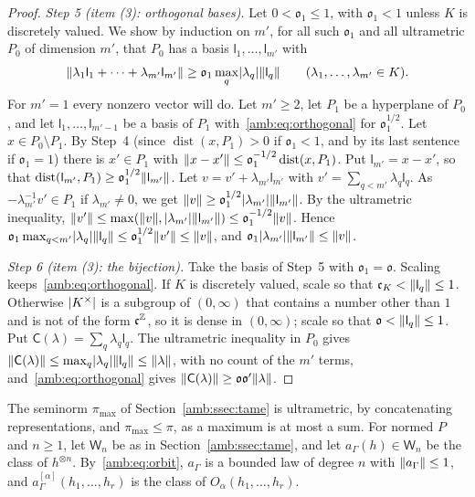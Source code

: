 \begin{proof}
\emph{Step 5 (item (3): orthogonal bases).} Let $0<\mathfrak o_1\le1$, with $\mathfrak o_1<1$ unless $K$ is discretely
valued. We show by induction on $m'$, for all such $\mathfrak o_1$ and all ultrametric $P_0$ of dimension $m'$, that $P_0$ has
a basis $\mathsf l_1,\dots,\mathsf l_{m'}$ with
\begin{equation}\label{amb:eq:orthogonal}
 \lVert \lambda_1\mathsf l_1+\dots+\lambda_{m'}\mathsf l_{m'}\rVert\ge\mathfrak o_1\max_q\lvert \lambda_q\rvert\lVert \mathsf l_q\rVert
 \qquad(\lambda_1,\dots,\lambda_{m'}\in K).
\end{equation}
For $m'=1$ every nonzero vector will do. Let $m'\ge2$, let $P_1$ be a hyperplane of $P_0$, and let
$\mathsf l_1,\dots,\mathsf l_{m'-1}$ be a basis of $P_1$ with~\eqref{amb:eq:orthogonal} for $\mathfrak o_1^{1/2}$. Let
$x\in P_0\setminus P_1$. By Step~4 (since $\operatorname{dist}(x,P_1)>0$ if $\mathfrak o_1<1$, and by its last sentence if $\mathfrak o_1=1$) there is $x'\in P_1$ with $\lVert x-x'\rVert\le\mathfrak o_1^{-1/2}\operatorname{dist}(x,P_1)$.
Put $\mathsf l_{m'}=x-x'$, so that $\operatorname{dist}(\mathsf l_{m'},P_1)\ge\mathfrak o_1^{1/2}\lVert \mathsf l_{m'}\rVert$. Let
$v=v'+\lambda_{m'}\mathsf l_{m'}$ with $v'=\sum_{q<m'}\lambda_q\mathsf l_q$. As $-\lambda_{m'}^{-1}v'\in P_1$ if
$\lambda_{m'}\ne0$, we get $\lVert v\rVert\ge\mathfrak o_1^{1/2}\lvert \lambda_{m'}\rvert\lVert \mathsf l_{m'}\rVert$. By the ultrametric
inequality, $\lVert v'\rVert\le\max(\lVert v\rVert,\lvert \lambda_{m'}\rvert\lVert \mathsf l_{m'}\rVert)\le\mathfrak o_1^{-1/2}\lVert v\rVert$. Hence
$\mathfrak o_1\max_{q<m'}\lvert \lambda_q\rvert\lVert \mathsf l_q\rVert\le\mathfrak o_1^{1/2}\lVert v'\rVert\le\lVert v\rVert$, and
$\mathfrak o_1\lvert \lambda_{m'}\rvert\lVert \mathsf l_{m'}\rVert\le\lVert v\rVert$.

\emph{Step 6 (item (3): the bijection).} Take the basis of Step~5 with $\mathfrak o_1=\mathfrak o$. Scaling keeps~\eqref{amb:eq:orthogonal}. If $K$
is discretely valued, scale so that $\mathfrak c_K<\lVert \mathsf l_q\rVert\le1$. Otherwise $\lvert K^\times\rvert$ is a subgroup of $(0,\infty)$ that contains a number other than $1$ and is not of the form $\mathfrak c^{\mathbb Z}$, so it is dense in
$(0,\infty)$; scale so that $\mathfrak o<\lVert \mathsf l_q\rVert\le1$. Put $\mathsf C(\lambda)=\sum_q\lambda_q\mathsf l_q$. The
ultrametric inequality in $P_0$ gives $\lVert \mathsf C(\lambda)\rVert\le\max_q\lvert \lambda_q\rvert\lVert \mathsf l_q\rVert\le\lVert \lambda\rVert$,
with no count of the $m'$ terms, and~\eqref{amb:eq:orthogonal} gives
$\lVert \mathsf C(\lambda)\rVert\ge\mathfrak o\mathfrak o'\lVert \lambda\rVert$.
\end{proof}

The seminorm $\pi_{\max}$ of Section~\ref{amb:ssec:tame} is ultrametric, by concatenating representations, and
$\pi_{\max}\le\pi$, as a maximum is at most a sum. For normed $P$ and $n\ge1$, let $\mathsf W_n$ be as in Section~\ref{amb:ssec:tame}, and let
$a_\Gamma(h)\in \mathsf W_n$ be the class of $h^{\otimes n}$. By~\eqref{amb:eq:orbit}, $a_\Gamma$ is a bounded law of degree $n$ with
$\lVert a_\Gamma\rVert\le1$, and $a_\Gamma^{[\alpha]}(h_1,\dots,h_r)$ is the class of $O_\alpha(h_1,\dots,h_r)$.

